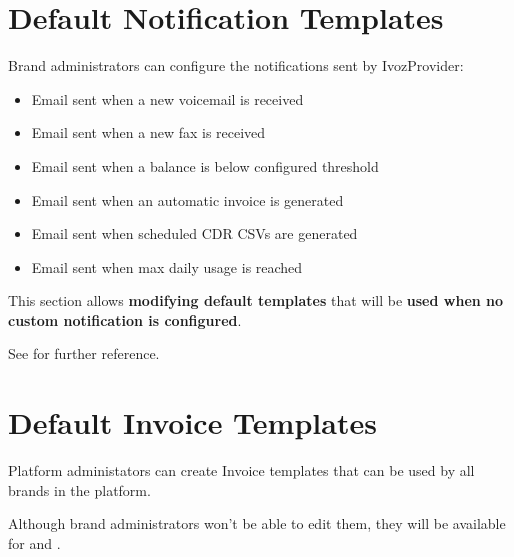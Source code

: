 \documentclass[letterpaper,10pt,spanish]{sphinxmanual}
\begin{document}
\section{Default Notification Templates}
\label{administration_portal/platform/default_notification_templates:id2}\label{administration_portal/platform/default_notification_templates::doc}\label{administration_portal/platform/default_notification_templates:default-notification-templates}\label{administration_portal/platform/default_notification_templates:id1}
Brand administrators can configure the notifications sent by IvozProvider:
\begin{itemize}
\item {} 
Email sent when a new voicemail is received

\item {} 
Email sent when a new fax is received

\item {} 
Email sent when a balance is below configured threshold

\item {} 
Email sent when an automatic invoice is generated

\item {} 
Email sent when scheduled CDR CSVs are generated

\item {} 
Email sent when max daily usage is reached

\end{itemize}

This section allows \textbf{modifying default templates} that will be \textbf{used when no custom notification is configured}.

See {\hyperref[administration_portal/brand/settings/notification_templates:notification\string-templates]{}} for further reference.


\section{Default Invoice Templates}
\label{administration_portal/platform/default_invoice_templates::doc}\label{administration_portal/platform/default_invoice_templates:default-invoice-templates}\label{administration_portal/platform/default_invoice_templates:id1}
Platform administators can create Invoice templates that can be used by all brands in the platform.

Although brand administrators won't be able to edit them, they will be available for {\hyperref[administration_portal/brand/invoicing/invoices:invoices]{}}
and {\hyperref[administration_portal/brand/invoicing/invoice_schedulers:invoice\string-schedulers]{}}.
\end{document}
